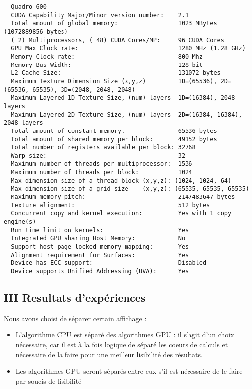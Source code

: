 \documentclass[]{article}
\providecommand{\tightlist}{%
  \setlength{\itemsep}{0pt}\setlength{\parskip}{0pt}}
\begin{document}
\begin{verbatim}
  Quadro 600
  CUDA Capability Major/Minor version number:    2.1
  Total amount of global memory:                 1023 MBytes (1072889856 bytes)
  ( 2) Multiprocessors, ( 48) CUDA Cores/MP:     96 CUDA Cores
  GPU Max Clock rate:                            1280 MHz (1.28 GHz)
  Memory Clock rate:                             800 Mhz
  Memory Bus Width:                              128-bit
  L2 Cache Size:                                 131072 bytes
  Maximum Texture Dimension Size (x,y,z)         1D=(65536), 2D=(65536, 65535), 3D=(2048, 2048, 2048)
  Maximum Layered 1D Texture Size, (num) layers  1D=(16384), 2048 layers
  Maximum Layered 2D Texture Size, (num) layers  2D=(16384, 16384), 2048 layers
  Total amount of constant memory:               65536 bytes
  Total amount of shared memory per block:       49152 bytes
  Total number of registers available per block: 32768
  Warp size:                                     32
  Maximum number of threads per multiprocessor:  1536
  Maximum number of threads per block:           1024
  Max dimension size of a thread block (x,y,z): (1024, 1024, 64)
  Max dimension size of a grid size    (x,y,z): (65535, 65535, 65535)
  Maximum memory pitch:                          2147483647 bytes
  Texture alignment:                             512 bytes
  Concurrent copy and kernel execution:          Yes with 1 copy engine(s)
  Run time limit on kernels:                     Yes
  Integrated GPU sharing Host Memory:            No
  Support host page-locked memory mapping:       Yes
  Alignment requirement for Surfaces:            Yes
  Device has ECC support:                        Disabled
  Device supports Unified Addressing (UVA):      Yes
\end{verbatim}

\subsection{III Resultats
d'expériences}\label{iii-resultats-dexperiences}

Nous avons choisi de séparer certain affichage :

\begin{itemize}
\tightlist
\item
  L'algorithme CPU est séparé des algorithmes GPU : il s'agit d'un choix
  nécessaire, car il est à la fois logique de séparé les coeurs de
  calculs et nécessaire de la faire pour une meilleur lisibilité des
  résultats.
\item
  Les algorithmes GPU seront séparés entre eux s'il est nécessaire de le
  faire par soucis de lisibilité
\end{itemize}
\end{document}
